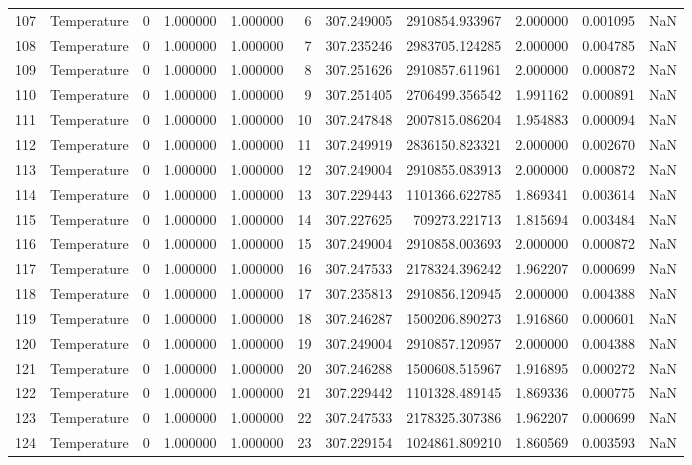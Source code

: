 \begin{tabular}{llrrrrrrrrr}
107 & Temperature & 0 & 1.000000 & 1.000000 & 6 & 307.249005 & 2910854.933967 & 2.000000 & 0.001095 & NaN \\
108 & Temperature & 0 & 1.000000 & 1.000000 & 7 & 307.235246 & 2983705.124285 & 2.000000 & 0.004785 & NaN \\
109 & Temperature & 0 & 1.000000 & 1.000000 & 8 & 307.251626 & 2910857.611961 & 2.000000 & 0.000872 & NaN \\
110 & Temperature & 0 & 1.000000 & 1.000000 & 9 & 307.251405 & 2706499.356542 & 1.991162 & 0.000891 & NaN \\
111 & Temperature & 0 & 1.000000 & 1.000000 & 10 & 307.247848 & 2007815.086204 & 1.954883 & 0.000094 & NaN \\
112 & Temperature & 0 & 1.000000 & 1.000000 & 11 & 307.249919 & 2836150.823321 & 2.000000 & 0.002670 & NaN \\
113 & Temperature & 0 & 1.000000 & 1.000000 & 12 & 307.249004 & 2910855.083913 & 2.000000 & 0.000872 & NaN \\
114 & Temperature & 0 & 1.000000 & 1.000000 & 13 & 307.229443 & 1101366.622785 & 1.869341 & 0.003614 & NaN \\
115 & Temperature & 0 & 1.000000 & 1.000000 & 14 & 307.227625 & 709273.221713 & 1.815694 & 0.003484 & NaN \\
116 & Temperature & 0 & 1.000000 & 1.000000 & 15 & 307.249004 & 2910858.003693 & 2.000000 & 0.000872 & NaN \\
117 & Temperature & 0 & 1.000000 & 1.000000 & 16 & 307.247533 & 2178324.396242 & 1.962207 & 0.000699 & NaN \\
118 & Temperature & 0 & 1.000000 & 1.000000 & 17 & 307.235813 & 2910856.120945 & 2.000000 & 0.004388 & NaN \\
119 & Temperature & 0 & 1.000000 & 1.000000 & 18 & 307.246287 & 1500206.890273 & 1.916860 & 0.000601 & NaN \\
120 & Temperature & 0 & 1.000000 & 1.000000 & 19 & 307.249004 & 2910857.120957 & 2.000000 & 0.004388 & NaN \\
121 & Temperature & 0 & 1.000000 & 1.000000 & 20 & 307.246288 & 1500608.515967 & 1.916895 & 0.000272 & NaN \\
122 & Temperature & 0 & 1.000000 & 1.000000 & 21 & 307.229442 & 1101328.489145 & 1.869336 & 0.000775 & NaN \\
123 & Temperature & 0 & 1.000000 & 1.000000 & 22 & 307.247533 & 2178325.307386 & 1.962207 & 0.000699 & NaN \\
124 & Temperature & 0 & 1.000000 & 1.000000 & 23 & 307.229154 & 1024861.809210 & 1.860569 & 0.003593 & NaN \\

\end{tabular}
